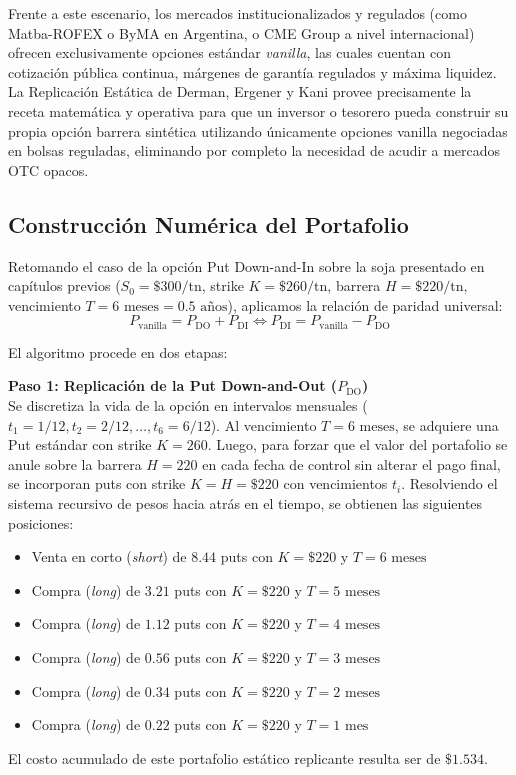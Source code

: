 Frente a este escenario, los mercados institucionalizados y regulados (como Matba-ROFEX o ByMA en Argentina, o CME Group a nivel internacional) ofrecen exclusivamente opciones estándar \textit{vanilla}, las cuales cuentan con cotización pública continua, márgenes de garantía regulados y máxima liquidez. La Replicación Estática de Derman, Ergener y Kani provee precisamente la receta matemática y operativa para que un inversor o tesorero pueda construir su propia opción barrera sintética utilizando únicamente opciones vanilla negociadas en bolsas reguladas, eliminando por completo la necesidad de acudir a mercados OTC opacos.

\subsection{Construcción Numérica del Portafolio}

Retomando el caso de la opción Put Down-and-In sobre la soja presentado en capítulos previos ($S_0 = \$300/\text{tn}$, strike $K = \$260/\text{tn}$, barrera $H = \$220/\text{tn}$, vencimiento $T = 6\text{ meses} = 0.5\text{ años}$), aplicamos la relación de paridad universal:
\begin{equation}
P_{\text{vanilla}} = P_{\text{DO}} + P_{\text{DI}} \iff P_{\text{DI}} = P_{\text{vanilla}} - P_{\text{DO}}
\end{equation}

El algoritmo procede en dos etapas:

\textbf{Paso 1: Replicación de la Put Down-and-Out ($P_{\text{DO}}$)}\\
Se discretiza la vida de la opción en intervalos mensuales ($t_1 = 1/12, t_2 = 2/12, \dots, t_6 = 6/12$). Al vencimiento $T=6\text{ meses}$, se adquiere una Put estándar con strike $K=260$. Luego, para forzar que el valor del portafolio se anule sobre la barrera $H=220$ en cada fecha de control sin alterar el pago final, se incorporan puts con strike $K=H=\$220$ con vencimientos $t_i$. Resolviendo el sistema recursivo de pesos hacia atrás en el tiempo, se obtienen las siguientes posiciones:
\begin{itemize}
    \item Venta en corto (\textit{short}) de $8.44$ puts con $K = \$220$ y $T = 6\text{ meses}$
    \item Compra (\textit{long}) de $3.21$ puts con $K = \$220$ y $T = 5\text{ meses}$
    \item Compra (\textit{long}) de $1.12$ puts con $K = \$220$ y $T = 4\text{ meses}$
    \item Compra (\textit{long}) de $0.56$ puts con $K = \$220$ y $T = 3\text{ meses}$
    \item Compra (\textit{long}) de $0.34$ puts con $K = \$220$ y $T = 2\text{ meses}$
    \item Compra (\textit{long}) de $0.22$ puts con $K = \$220$ y $T = 1\text{ mes}$
\end{itemize}
El costo acumulado de este portafolio estático replicante resulta ser de $\$1.534$.


